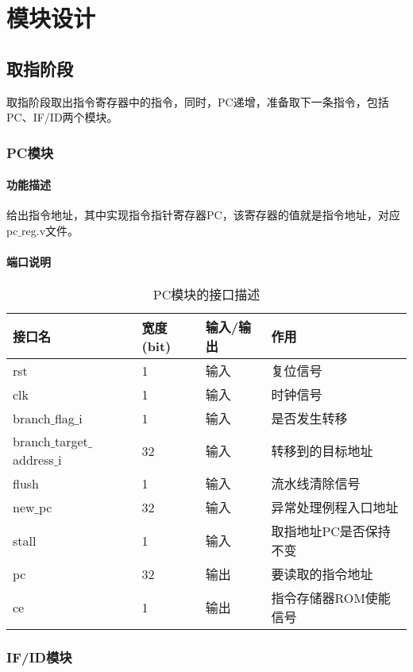 \section{模块设计}
\subsection{取指阶段}
取指阶段取出指令寄存器中的指令，同时，PC递增，准备取下一条指令，包括PC、IF/ID两个模块。
\subsubsection{PC模块}
\paragraph{功能描述}
\quad

\quad

给出指令地址，其中实现指令指针寄存器PC，该寄存器的值就是指令地址，对应pc$\_$reg.v文件。
\paragraph{端口说明}
\quad

\quad
\begin{table}[H]
	\centering
	\caption{PC模块的接口描述}
	\begin{tabular}{|l|l|l|l|}
		\hline
		接口名 & 宽度(bit) & 输入/输出 & 作用 \\
		\hline
		rst & 1 & 输入 & 复位信号 \\
		\hline
		clk & 1 & 输入 & 时钟信号 \\
		\hline
		branch$\_$flag$\_$i & 1 & 输入 & 是否发生转移 \\
		\hline
		branch$\_$target$\_$address$\_$i & 32 & 输入 & 转移到的目标地址 \\
		\hline
		flush & 1 & 输入 & 流水线清除信号 \\
		\hline
		new$\_$pc & 32 & 输入 & 异常处理例程入口地址 \\
		\hline
		stall & 1 & 输入 & 取指地址PC是否保持不变 \\
		\hline
		pc & 32 & 输出 & 要读取的指令地址 \\
		\hline
		ce & 1 & 输出 & 指令存储器ROM使能信号 \\
		\hline
	\end{tabular}
\end{table}
\subsubsection{IF/ID模块}
